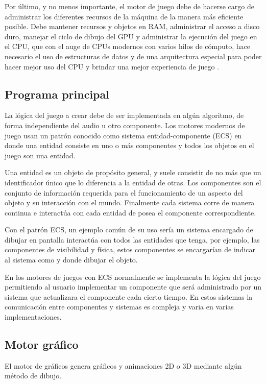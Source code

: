 Por último, y no menos importante, el motor de juego debe de hacerse cargo de administrar los diferentes recursos de la máquina de la manera más eficiente posible. Debe mantener recursos y objetos en RAM, administrar el acceso a disco duro, manejar el ciclo de dibujo del GPU y administrar la ejecución del juego en el CPU, que con el auge de CPUs modernos con varios hilos de cómputo, hace necesario el uso de estructuras de datos y de una arquitectura especial para poder hacer mejor uso del CPU y brindar una mejor experiencia de juego \cite{andrews2009designing}.

\subsection{Programa principal} \label{sec:MTlogica}

La lógica del juego a crear debe de ser implementada en algún algoritmo, de forma independiente del audio u otro componente. Los motores modernos de juego usan un patrón conocido como sistema entidad-componente (ECS) en donde una entidad consiste en uno o más componentes y todos los objetos en el juego son una entidad.

Una entidad es un objeto de propósito general, y suele consistir de no más que un identificador único que lo diferencia a la entidad de otras. Los componentes son el conjunto de información requerida para el funcionamiento de un aspecto del objeto y su interacción con el mundo. Finalmente cada sistema corre de manera continua e interactúa con cada entidad de posea el componente correspondiente.

Con el patrón ECS, un ejemplo común de su uso sería un sistema encargado de dibujar en pantalla interactúa con todos las entidades que tenga, por ejemplo, las componentes de visibilidad y física, estos componentes se encargarían de indicar al sistema como y donde dibujar el objeto.

En los motores de juegos con ECS normalmente se implementa la lógica del juego permitiendo al usuario implementar un componente que será administrado por un sistema que actualizara el componente cada cierto tiempo. En estos sistemas la comunicación entre componentes y sistemas es compleja y varia en varias implementaciones.

\subsection{Motor gráfico}

El motor de gráficos genera gráficos y animaciones 2D o 3D mediante algún método de dibujo.

